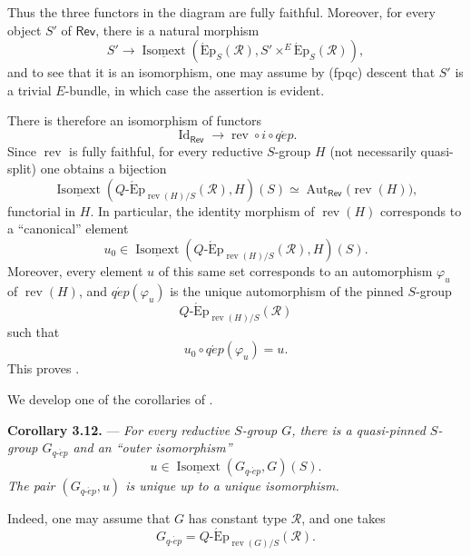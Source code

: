 Thus the three functors in the diagram are fully faithful. Moreover,
for every object \(S'\) of \(\mathsf{Rev}\), there is a natural
morphism
\[
  S'
  \longrightarrow
  \underline{\operatorname{Isomext}}\!\left(
    \operatorname{\acute{E}p}_S(\mathscr R),
    S'\times^E\operatorname{\acute{E}p}_S(\mathscr R)
  \right),
\]
and to see that it is an isomorphism, one may assume by
\textup{(fpqc)} descent that \(S'\) is a trivial \(E\)-bundle, in
which case the assertion is evident.

There is therefore an isomorphism of functors
\[
  \operatorname{Id}_{\mathsf{Rev}}
  \longrightarrow
  \operatorname{rev}\circ i\circ q\acute{e}p.
\]
Since \(\operatorname{rev}\) is fully faithful, for every reductive
\(S\)-group \(H\) (not necessarily quasi-split) one obtains a
bijection
\[
  \underline{\operatorname{Isomext}}\!\left(
    Q\text{-}\operatorname{\acute{E}p}_{\operatorname{rev}(H)/S}
      (\mathscr R),
    H
  \right)(S)
  \simeq
  \operatorname{Aut}_{\mathsf{Rev}}\bigl(\operatorname{rev}(H)\bigr),
\]
functorial in \(H\). In particular, the identity morphism of
\(\operatorname{rev}(H)\) corresponds to a ``canonical'' element
\[
  u_0\in
  \underline{\operatorname{Isomext}}\!\left(
    Q\text{-}\operatorname{\acute{E}p}_{\operatorname{rev}(H)/S}
      (\mathscr R),
    H
  \right)(S).
\]
Moreover, every element \(u\) of this same set corresponds to an
automorphism \(\varphi_u\) of \(\operatorname{rev}(H)\), and
\(q\acute{e}p(\varphi_u)\) is the unique automorphism of the pinned
\(S\)-group
\[
  Q\text{-}\operatorname{\acute{E}p}_{\operatorname{rev}(H)/S}
    (\mathscr R)
\]
such that
\[
  u_0\circ q\acute{e}p(\varphi_u)=u.
\]
This proves .

We develop one of the corollaries of .

\medskip\noindent\textbf{Corollary 3.12.} ---
{\itshape For every reductive \(S\)-group \(G\), there is a quasi-pinned
\(S\)-group \(G_{q\text{-}\acute{e}p}\) and an ``outer isomorphism''}
\[
  u\in
  \underline{\operatorname{Isomext}}
    (G_{q\text{-}\acute{e}p},G)(S).
\]
{\itshape The pair \((G_{q\text{-}\acute{e}p},u)\) is unique up to a
unique isomorphism.}

Indeed, one may assume that \(G\) has constant type \(\mathscr R\),
and one takes
\[
  G_{q\text{-}\acute{e}p}
  =
  Q\text{-}\operatorname{\acute{E}p}_{\operatorname{rev}(G)/S}
    (\mathscr R).
\]

